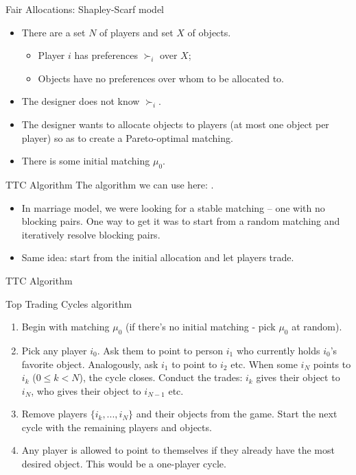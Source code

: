 \documentclass[english,10pt
,aspectratio=169
]{beamer}
\begin{document}
\begin{frame}{Fair Allocations: Shapley-Scarf model}
\begin{itemize}
	\item There are a set $N$ of players and set $X$ of objects.
	\begin{itemize}
		\item Player $i$ has preferences $\succ_i$ over $X$;
		\item Objects have no preferences over whom to be allocated to.
	\end{itemize}
	\item The designer does not know $\succ_i$.
	\item The designer wants to allocate objects to players (at most one object per player) so as to create a Pareto-optimal matching.
	\item There is some initial matching $\mu_0$.
\end{itemize}
\end{frame}



\begin{frame}{TTC Algorithm}
	The algorithm we can use here: .
	\begin{itemize}
		\item In marriage model, we were looking for a stable matching -- one with no blocking pairs. One way to get it was to start from a random matching and iteratively resolve blocking pairs.
		\item Same idea: start from the initial allocation and let players trade.
	\end{itemize}
\end{frame}


\begin{frame}{TTC Algorithm}
\begin{alertblock}{Top Trading Cycles algorithm}
	\begin{enumerate}
		\item Begin with matching $\mu_0$ (if there's no initial matching - pick $\mu_0$ at random).
		\item Pick any player $i_0$. Ask them to point to person $i_1$ who currently holds $i_0$'s favorite object. Analogously, ask $i_1$ to point to $i_2$ etc. When some $i_N$ points to $i_k$ ($0\leq k < N$), the cycle closes. Conduct the trades: $i_k$ gives their object to $i_N$, who gives their object to $i_{N-1}$ etc.
		\item Remove players $\{i_k,...,i_N\}$ and their objects from the game. Start the next cycle with the remaining players and objects.
		\item Any player is allowed to point to themselves if they already have the most desired object. This would be a one-player cycle.
	\end{enumerate}
\end{alertblock}
\end{frame}
\end{document}
